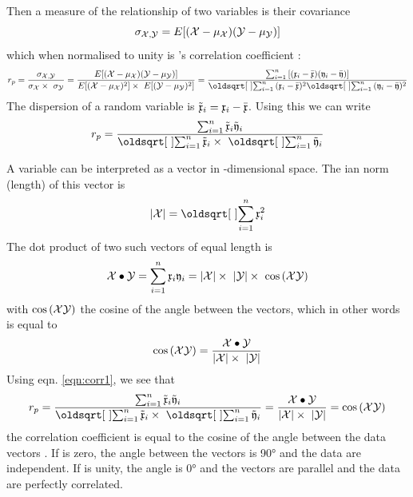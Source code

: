 \begin{refsection}
Then a measure of the relationship of two variables  is their covariance
\begin{equation}
  \sigma_{\mathcal{X,Y}} = E[(\mathcal{X} -\mu_{\mathcal{X}})(\mathcal{Y} - \mu_{\mathcal{Y}})]
\end{equation}
which when normalised to unity is 's correlation coefficient :
\begin{equation}
  r_p = \frac{\sigma_\arr{X,Y}}{\sigma_\arr{X} \times\ \sigma_\arr{Y}}
      = \frac{E[(\arr{X} -\mu_\arr{X})(\arr{Y} - \mu_\arr{Y})]}{E[(\arr{X}-\mu_\arr{X})^2] \times\  E[(\arr{Y}-\mu_\arr{Y})^2]}
      = \frac{\sum_{i=1}^n{[(\AbsVec{x}_i - \bar{\AbsVec{x}}) (\AbsVec{y}_i - \bar{\AbsVec{y}})]}}{\sqrt{\sum_{i=1}^n{(\AbsVec{x}_i - \bar{\AbsVec{x}})^2}} \sqrt{\sum_{i=1}^n{(\AbsVec{y}_i - \bar{\AbsVec{y}})^2}}}
\end{equation}
The dispersion of a random variable is \(\tilde{\mathfrak{x}}_i = \mathfrak{x}_i - \bar{\mathfrak{x}} \). Using this we can write
\begin{equation} \label{eqn:corr1}
  r_p = \frac{\sum_{i=1}^n{\tilde{\AbsVec{x}}_i \tilde{\AbsVec{y}}_i}}{\sqrt{\sum_{i=1}^n{\tilde{\AbsVec{x}}_i}} \times\ \sqrt{\sum_{i=1}^n{\tilde{\AbsVec{y}}_i}}}
\end{equation}

A variable  can be interpreted as a vector in -dimensional space. The ian norm (length) of this vector is
\begin{equation} \label{eqn:norm}
  |\arr{X}| = \sqrt{\sum_{i=1}^n{\AbsVec{x}_i^2}}
\end{equation}
The dot product of two such vectors of equal length is
\begin{equation}
  \mathcal{X} \bullet \mathcal{Y} = \sum_{i=1}^{n}{\mathfrak{x}_i \mathfrak{y}_i} = |\mathcal{X}| \times\ |\mathcal{Y}| \times\ \cos{(\ensuremath{\mathcal{X}} \ensuremath{\mathcal{Y}})}
\end{equation}
with \(\cos{(\ensuremath{\mathcal{X}} \ensuremath{\mathcal{Y}})} \) the cosine of the angle between the vectors, which in other words is equal to
\begin{equation}
  \cos{(\ensuremath{\mathcal{X}} \ensuremath{\mathcal{Y}})} = \frac{\mathcal{X} \bullet \mathcal{Y}}{|\mathcal{X}| \times\ |\mathcal{Y}|}
\end{equation}
Using eqn. \ref{eqn:corr1}, we see that
\begin{equation} \label{eqn:cosine}
    r_p = \frac{\sum_{i=1}^n{\tilde{\AbsVec{x}}_i \tilde{\AbsVec{y}}_i}}{\sqrt{\sum_{i=1}^n{\tilde{\AbsVec{x}}_i}} \times\ \sqrt{\sum_{i=1}^n{\tilde{\AbsVec{y}}_i}}} = \frac{\arr{X} \bullet \arr{Y}}{|\arr{X}| \times\ |\arr{Y}|} = \cos{(\arr{X} \arr{Y})}
\end{equation}
the correlation coefficient  is equal to the cosine of the angle between the data vectors . If  is zero, the angle between the vectors is \ang{90} and the data are independent. If  is unity, the angle is \ang{0} and the vectors are parallel and the data are perfectly correlated.


\end{refsection}

